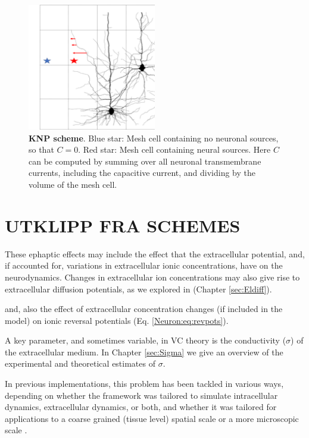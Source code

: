 \begin{figure}[!ht]
\begin{center}
\includegraphics[width=0.5\textwidth]{Figures/Eldiff/KNP.png}
\end{center}
\caption{\textbf{KNP scheme}. Blue star: Mesh cell containing no neuronal sources, so that $C=0$. Red star: Mesh cell containing neural sources. Here $C$ can be computed by summing over all neuronal transmembrane currents, including the capacitive current, and dividing by the volume of the mesh cell. }
\label{Eldiff:fig:KNPmesh}
\end{figure}


\section{UTKLIPP FRA SCHEMES}
These ephaptic effects may include the effect that the extracellular potential, and, if accounted for, variations in extracellular ionic concentrations, have on the neurodynamics. Changes in extracellular ion concentrations may also give rise to extracellular diffusion potentials, as we explored in (Chapter \ref{sec:Eldiff}).


and, also the effect of extracellular concentration changes  (if included in the model) on ionic reversal potentials (Eq. \ref{Neuron:eq:revpots}). 


A key parameter, and sometimes variable, in VC theory is the conductivity ($\sigma$) of the extracellular medium. In Chapter \ref{sec:Sigma} we give an overview of the experimental and theoretical estimates of $\sigma$. 


In previous implementations, this problem has been tackled in various ways, depending on whether the framework was tailored to simulate intracellular dynamics, extracellular dynamics, or both, and whether it was tailored for applications to a coarse grained (tissue level) spatial scale or a more microscopic scale \citep{Qian1989, Mori2008, Mori2009, Mori2009a, Mori2011, Halnes2015, Halnes2013, Pods2017, Niederer2013, OConnell2016, Solbra2018, tuttle2019, ellingsrud2020}.



